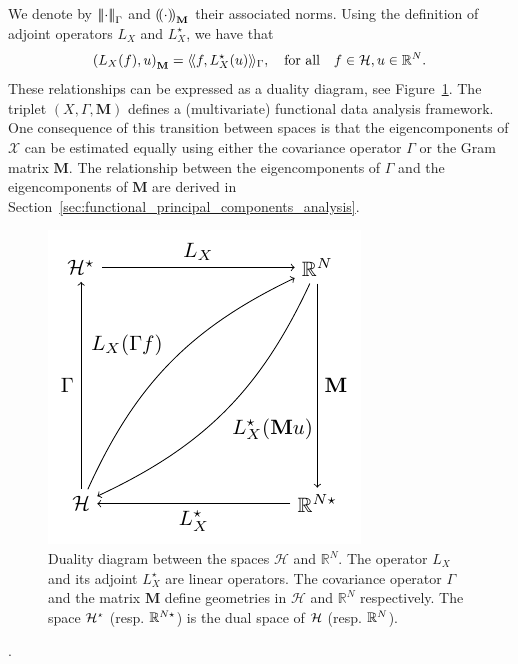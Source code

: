 {\begin{equation}
\end{equation}
We denote by $\left|\!\left|\!\left|\cdot\right|\!\right|\!\right|_\Gamma$ and $\left(\!\left(\cdot\right)\!\right)_{\mathbf{M}}$ their associated norms.
Using the definition of adjoint operators $L_X$ and $L^\star_X$, we have that
\begin{equation}
    \left(L_X(f), u\right)_{\mathbf{M}} = \langle\!\langle f, L^\star_X(u)\rangle\!\rangle_\Gamma, \quad\text{for all}\quad f \in \mathcal{H}, u \in \mathbb{R}^N.
\end{equation}
These relationships can be expressed as a duality diagram, see Figure~\ref{fig:duality_diagram}. The triplet $(X, \Gamma, \mathbf{M})$ defines a (multivariate) functional data analysis framework. One consequence of this transition between spaces is that the eigencomponents of $\mathcal{X}$ can be estimated equally using either the covariance operator $\Gamma$ or the Gram matrix $\mathbf{M}$.} The relationship between the eigencomponents of $\Gamma$ and the eigencomponents of $\mathbf{M}$ are derived in Section~\ref{sec:functional_principal_components_analysis}.
\begin{figure}
    \centering
    \includegraphics[scale=1.2]{figures/duality_diagram.pdf}
    \caption{Duality diagram between the spaces $\mathcal{H}$ and $\mathbb{R}^N$. The operator $L_X$ and its adjoint $L^\star_X$ are linear operators. The covariance operator $\Gamma$ and the matrix $\mathbf{M}$ define geometries in $\mathcal{H}$ and $\mathbb{R}^N$ respectively. The space $\mathcal{H}^\star$ (resp. $\mathbb{R}^{N \star}$) is the dual space of $\mathcal{H}$ (resp. $\mathbb{R}^N$).}
    \label{fig:duality_diagram}
\end{figure}

\begin{remark}
   .
\end{remark}


